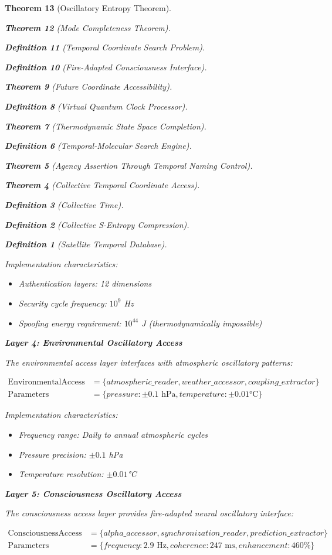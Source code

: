 \documentclass[12pt,a4paper]{article}
\newtheorem{theorem}{Theorem}[section]
\newtheorem{definition}[theorem]{Definition}
\begin{document}
\begin{theorem}[Oscillatory Entropy Theorem]
\begin{theorem}[Mode Completeness Theorem]
\begin{enumerate}
\begin{definition}[Temporal Coordinate Search Problem]
\begin{algorithm}
\begin{definition}[Fire-Adapted Consciousness Interface]
\begin{theorem}[Future Coordinate Accessibility]
\begin{definition}[Virtual Quantum Clock Processor]
\begin{itemize}
\begin{itemize}
\begin{theorem}[Thermodynamic State Space Completion]
\begin{definition}[Temporal-Molecular Search Engine]
\begin{theorem}[Agency Assertion Through Temporal Naming Control]
\begin{remark}
\begin{theorem}[Collective Temporal Coordinate Access]
\begin{definition}[Collective Time]
\begin{definition}[Collective S-Entropy Compression]
\begin{definition}[Satellite Temporal Database]
\begin{algorithm}
\begin{table}[h]
{{Implementation characteristics:
\begin{itemize}
\item Authentication layers: 12 dimensions
\item Security cycle frequency: $10^9$ Hz
\item Spoofing energy requirement: $10^{44}$ J (thermodynamically impossible)
\end{itemize}

\textbf{Layer 4: Environmental Oscillatory Access}

The environmental access layer interfaces with atmospheric oscillatory patterns:

\begin{align}
\text{EnvironmentalAccess} &= \{atmospheric\_reader, weather\_accessor, coupling\_extractor\} \\
\text{Parameters} &= \{pressure: \pm 0.1 \text{ hPa}, temperature: \pm 0.01°\text{C}\}
\end{align}

Implementation characteristics:
\begin{itemize}
\item Frequency range: Daily to annual atmospheric cycles
\item Pressure precision: $\pm 0.1$ hPa
\item Temperature resolution: $\pm 0.01$°C
\end{itemize}

\textbf{Layer 5: Consciousness Oscillatory Access}

The consciousness access layer provides fire-adapted neural oscillatory interface:

\begin{align}
\text{ConsciousnessAccess} &= \{alpha\_accessor, synchronization\_reader, prediction\_extractor\} \\
\text{Parameters} &= \{frequency: 2.9 \text{ Hz}, coherence: 247 \text{ ms}, enhancement: 460\%\}
\end{align}

}}
\end{table}
\end{algorithm}
\end{definition}
\end{definition}
\end{definition}
\end{theorem}
\end{remark}
\end{theorem}
\end{definition}
\end{theorem}
\end{itemize}
\end{itemize}
\end{definition}
\end{theorem}
\end{definition}
\end{algorithm}
\end{definition}
\end{enumerate}
\end{theorem}
\end{theorem}
\end{document}
